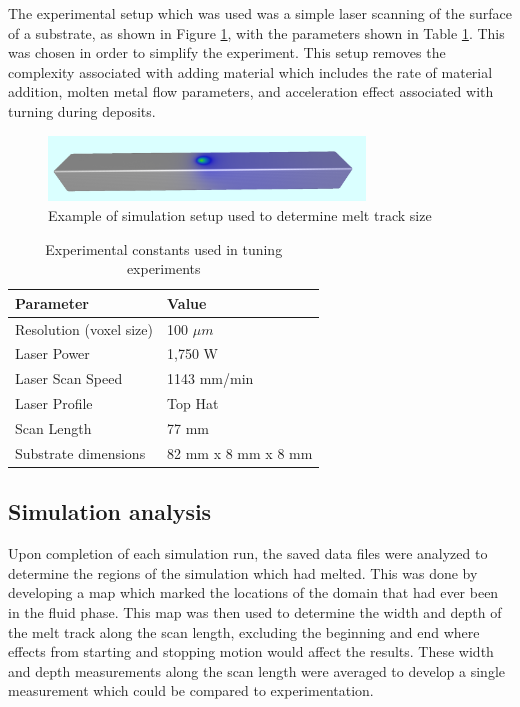 \documentclass[pdflatex,sn-mathphys]{sn-jnl}
\begin{document}
	The experimental setup which was used was a simple laser scanning of the surface of a substrate, as shown in Figure \ref{fig:melt_validation_example}, with the parameters shown in Table \ref{tab:exp_constants}.  This was chosen in order to simplify the experiment.  This setup removes the complexity associated with adding material which includes the rate of material addition, molten metal flow parameters, and acceleration effect associated with turning during deposits.
	\begin{figure}[!htb]
		\centering
		\includegraphics[width=0.75\textwidth]{melt_validation_example}
		\caption{Example of simulation setup used to determine melt track size}
		\label{fig:melt_validation_example}
	\end{figure}
	\begin{table}[!htb]
		\centering
		\caption{Experimental constants used in tuning experiments}
		\label{tab:exp_constants}
		\begin{tabular}{|l|l|} \hline
			Parameter & Value \\ \hline
			Resolution (voxel size) & 100 $\mu m$ \\ \hline
			Laser Power & 1,750 W \\ \hline
			Laser Scan Speed & 1143 mm/min \\ \hline
			Laser Profile & Top Hat \\ \hline
			Scan Length & 77 mm \\ \hline
			Substrate dimensions & 82 mm x 8 mm x 8 mm \\ \hline
		\end{tabular}
	\end{table}
	
	
	

	\subsection{Simulation analysis}
	\label{sim_analysis}

	Upon completion of each simulation run, the saved data files were analyzed to determine the regions of the simulation which had melted.  This was done by developing a map which marked the locations of the domain that had ever been in the fluid phase.  This map was then used to determine the width and depth of the melt track along the scan length, excluding the beginning and end where effects from starting and stopping motion would affect the results.  These width and depth measurements along the scan length were averaged to develop a single measurement which could be compared to experimentation.  
	
\end{document}
